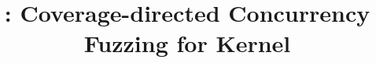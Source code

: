 \title{\sys: Coverage-directed Concurrency Fuzzing for Kernel}

\ifdefined\DRAFT
 \pagestyle{fancyplain}
 \rhead{\thedate}
\fi



\author{
}


